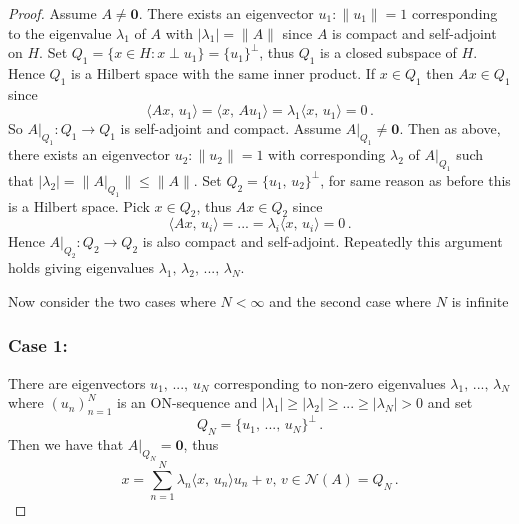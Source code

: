 \documentclass[12pt, a4paper]{article}
\begin{document}
\begin{proof}
Assume $A\neq \mathbf{0}$. There exists an eigenvector $u_1:\|u_1\|=1$ corresponding to the eigenvalue $\lambda_1$ of $A$ with $|\lambda_1|=\|A\|$ since $A$ is compact and self-adjoint on $H$. Set $Q_1 =\{x\in H : x\perp u_1\} = \{u_1\}^\perp$, thus $Q_1$ is a closed subspace of $H$. Hence $Q_1$ is a Hilbert space with the same inner product. If $x\in Q_1$ then $Ax\in Q_1$ since
\[
    \langle Ax,\,u_1\rangle=\langle x,\,Au_1\rangle=\lambda_1\langle x,\,u_1\rangle=0\,.
\]
So $A|_{Q_1}:Q_1\to Q_1$ is self-adjoint and compact. Assume $A|_{Q_1}\neq\mathbf{0}$. Then as above, there exists an eigenvector $u_2:\|u_2\|=1$ with corresponding $\lambda_2$ of $A|_{Q_1}$ such that $|\lambda_2|=\|A|_{Q_1}\|\leq\|A\|$. Set $Q_2=\{u_1,\,u_2\}^\perp$, for same reason as before this is a Hilbert space. Pick $x\in Q_2$, thus $Ax\in Q_2$ since
\[
    \langle Ax,\,u_i\rangle=...=\lambda_i\langle x,\,u_i\rangle=0\,.
\]
Hence $A|_{Q_2}:Q_2\to Q_2$ is also compact and self-adjoint. Repeatedly this argument holds giving eigenvalues $\lambda_1,\,\lambda_2,\,...,\,\lambda_N$.

\noindent Now consider the two cases where $N<\infty$ and the second case where $N$ is infinite
\subsubsection*{Case 1:}
There are eigenvectors $u_1,\,...,\,u_N$ corresponding to non-zero eigenvalues $\lambda_1,\,...,\,\lambda_N$ where $(u_n)_{n=1}^N$ is an ON-sequence and $|\lambda_1|\geq |\lambda_2|\geq...\geq|\lambda_N|>0$ and set
\[
    Q_N=\{u_1,\,...,\,u_N\}^\perp\,.
\]
Then we have that $A|_{Q_N}=\mathbf{0}$, thus 
\[
    x=\sum_{n=1}^N\lambda_n\langle x,\,u_n\rangle u_n+v,\,v\in\mathcal{N}(A)=Q_N\,.
\]

\end{proof}
\end{document}
